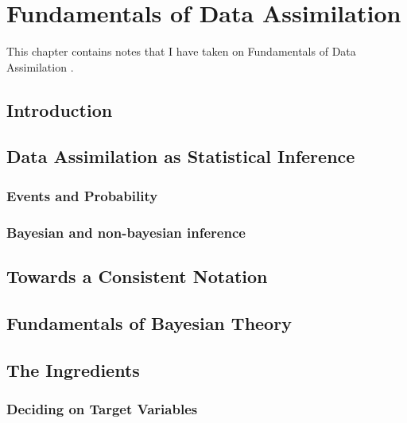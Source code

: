 \chapter{Fundamentals of Data Assimilation}
\label{ch:rayner_michalak_chevallier}

This chapter contains notes that I have taken on Fundamentals of Data Assimilation \citep{rayner2016fundamentals}.

\section{Introduction}
\label{rayner:intro}

\section{Data Assimilation as Statistical Inference}
\label{rayner:data_assimilation}

\subsection{Events and Probability}
\label{rayner:data_assimilation:events}

\subsection{Bayesian and non-bayesian inference}
\label{rayner:data_assimilation:bayes_non-bayes}

\section{Towards a Consistent Notation}
\label{rayner:consistent_notation}

\section{Fundamentals of Bayesian Theory}
\label{rayner:fundamental_bayes}

\section{The Ingredients}
\label{rayner:ingredients}

\subsection{Deciding on Target Variables}
\label{rayner:ingredients:target_variables}

